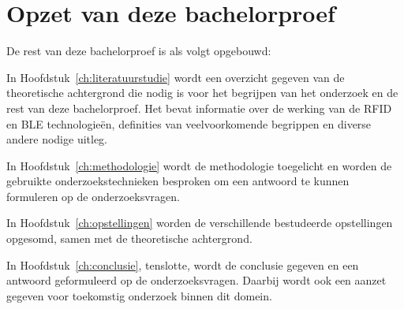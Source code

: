 \section{Opzet van deze bachelorproef}
\label{sec:opzet-bachelorproef}


De rest van deze bachelorproef is als volgt opgebouwd:

In Hoofdstuk~\ref{ch:literatuurstudie} wordt een overzicht gegeven van de theoretische achtergrond die nodig is voor het begrijpen van het onderzoek en de rest van deze bachelorproef. Het bevat informatie over de werking van de RFID en BLE technologieën, definities van veelvoorkomende begrippen en diverse andere nodige uitleg.


In Hoofdstuk~\ref{ch:methodologie} wordt de methodologie toegelicht en worden de gebruikte onderzoekstechnieken besproken om een antwoord te kunnen formuleren op de onderzoeksvragen.

In Hoofdstuk~\ref{ch:opstellingen} worden de verschillende bestudeerde opstellingen opgesomd, samen met de theoretische achtergrond.

In Hoofdstuk~\ref{ch:conclusie}, tenslotte, wordt de conclusie gegeven en een antwoord geformuleerd op de onderzoeksvragen. Daarbij wordt ook een aanzet gegeven voor toekomstig onderzoek binnen dit domein.

